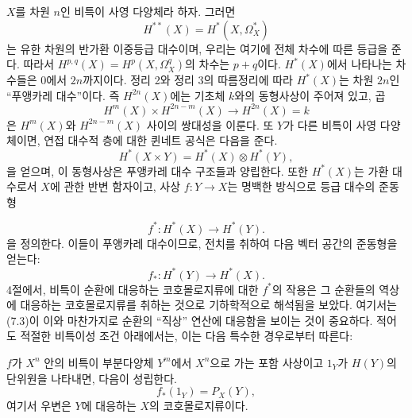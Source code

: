 
$X$를 차원 $n$인 비특이 사영 다양체라 하자. 그러면
\[
  H^{**}(X)=H^{*}(X,\Omega_X^{*})
\]
는 유한 차원의 반가환 이중등급 대수이며, 우리는 여기에 전체 차수에
따른 등급을 준다. 따라서 $H^{p,q}(X)=H^{p}(X,\Omega_X^{q})$의 차수는
$p+q$이다. $H^{*}(X)$에서 나타나는 차수들은 $0$에서 $2n$까지이다.
정리 2와 정리 3의 따름정리에 따라 $H^{*}(X)$는 차원 $2n$인
“푸앵카레 대수”이다. 즉 $H^{2n}(X)$에는 기초체 $k$와의 동형사상이
주어져 있고, 곱
\[
  H^{m}(X)\times H^{2n-m}(X)\longrightarrow H^{2n}(X)=k
\]
은 $H^{m}(X)$와 $H^{2n-m}(X)$ 사이의 쌍대성을 이룬다. 또 $Y$가
다른 비특이 사영 다양체이면, 연접 대수적 층에 대한 퀸네트 공식은
다음을 준다.
\begin{equation}\tag{7.1}
  H^{*}(X\times Y)=H^{*}(X)\otimes H^{*}(Y),
\end{equation}
을 얻으며, 이 동형사상은 푸앵카레 대수 구조들과 양립한다. 또한
$H^{*}(X)$는 가환 대수로서 $X$에 관한 반변 함자이고, 사상
$f:Y\longrightarrow X$는 명백한 방식으로 등급 대수의 준동형

\begin{equation}\tag{7.2}
  f^{*}:H^{*}(X)\longrightarrow H^{*}(Y).
\end{equation}
을 정의한다. 이들이 푸앵카레 대수이므로, 전치를 취하여 다음 벡터
공간의 준동형을 얻는다:
\begin{equation}\tag{7.3}
  f_{*}:H^{*}(Y)\longrightarrow H^{*}(X).
\end{equation}
4절에서, 비특이 순환에 대응하는 코호몰로지류에 대한 $f^{*}$의
작용은 그 순환들의 역상에 대응하는 코호몰로지류를 취하는 것으로
기하학적으로 해석됨을 보았다. 여기서는 (7.3)이 이와 마찬가지로
순환의 “직상” 연산에 대응함을 보이는 것이 중요하다. 적어도 적절한
비특이성 조건 아래에서는, 이는 다음 특수한 경우로부터 따른다:

 $f$가 $X^{n}$ 안의 비특이 부분다양체 $Y^{m}$에서
$X^{n}$으로 가는 포함 사상이고 $1_Y$가 $H(Y)$의 단위원을 나타내면,
다음이 성립한다.
\begin{equation}\tag{7.4}
  f_{*}(1_Y)=P_X(Y),
\end{equation}
여기서 우변은 $Y$에 대응하는 $X$의 코호몰로지류이다.

